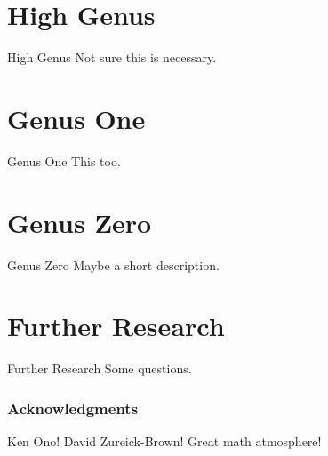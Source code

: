 \documentclass{beamer}
\theoremstyle{remark}
\begin{document}
\section{High Genus} 

\begin{frame}{High Genus}
Not sure this is necessary.

\end{frame}

\section{Genus One} 

\begin{frame}{Genus One}
This too.

\end{frame}

\section{Genus Zero} 

\begin{frame}{Genus Zero}
Maybe a short description.

\end{frame}

\section{Further Research} 

\begin{frame}{Further Research}
Some questions.

\end{frame}


\begin{frame}
\frametitle{Acknowledgments}
Ken Ono!
David Zureick-Brown!
Great math atmosphere!

\end{frame}
\end{document}
